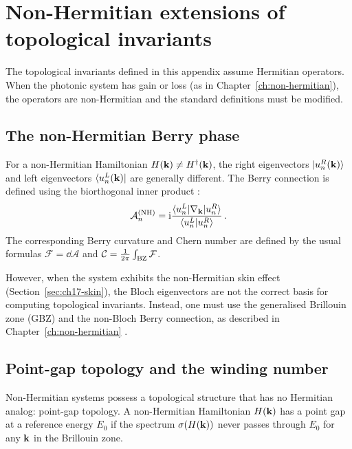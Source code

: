 \section{Non-Hermitian extensions of topological invariants}
\label{sec:appB-non-hermitian-topology}

The topological invariants defined in this appendix assume Hermitian
operators.  When the photonic system has gain or loss (as in
Chapter~\ref{ch:non-hermitian}), the operators are non-Hermitian and
the standard definitions must be modified.

\subsection{The non-Hermitian Berry phase}
\label{sec:appB-nh-berry}

For a non-Hermitian Hamiltonian $H(\mathbf{k})\neq H^\dagger(\mathbf{k})$, the
right eigenvectors $|u_n^R(\mathbf{k})\rangle$ and left eigenvectors
$\langle u_n^L(\mathbf{k})|$ are generally different.  The Berry
connection is defined using the biorthogonal inner product
\cite{shen2017topological,kunst2018biorthogonal}:
\begin{equation}\label{eq:appB-nh-berry-connection}
  \mathcal{A}_n^{(\mathrm{NH})}
  = \mathrm{i}\frac{\langle u_n^L|\nabla_{\mathbf{k}}|u_n^R\rangle}
  {\langle u_n^L|u_n^R\rangle}\,.
\end{equation}
The corresponding Berry curvature and Chern number are defined by
the usual formulas $\mathcal{F}=\dd\mathcal{A}$ and
$\mathcal{C}=\frac{1}{2\pi}\int_{\mathrm{BZ}}\mathcal{F}$.

However, when the system exhibits the non-Hermitian skin effect
(Section~\ref{sec:ch17-skin}), the Bloch eigenvectors are not the
correct basis for computing topological invariants.  Instead, one
must use the generalised Brillouin zone (GBZ) and the non-Bloch
Berry connection, as described in
Chapter~\ref{ch:non-hermitian}
\cite{imura2020generalized,yokomizo2019non}.

\subsection{Point-gap topology and the winding number}
\label{sec:appB-point-gap}

Non-Hermitian systems possess a topological structure that has no
Hermitian analog: point-gap topology.  A non-Hermitian Hamiltonian
$H(\mathbf{k})$ has a point gap at a reference energy $E_0$ if the
spectrum $\sigma(H(\mathbf{k}))$ never passes through $E_0$ for any
$\mathbf{k}$ in the Brillouin zone.

